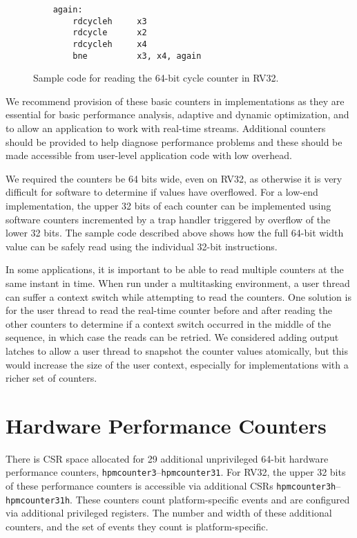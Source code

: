 \begin{figure}[h!]
\begin{center}
\begin{verbatim}
    again:
        rdcycleh     x3
        rdcycle      x2
        rdcycleh     x4
        bne          x3, x4, again
\end{verbatim}
\end{center}
\caption{Sample code for reading the 64-bit cycle counter in RV32.}
\label{rdcycle}
\end{figure}

\begin{commentary}
We recommend provision of these basic counters in implementations
as they are essential for basic performance analysis, adaptive and
dynamic optimization, and to allow an application to work with
real-time streams.  Additional counters should be provided to help
diagnose performance problems and these should be made accessible from
user-level application code with low overhead.

We required the counters be 64 bits wide, even on RV32, as otherwise
it is very difficult for software to determine if values have
overflowed.  For a low-end implementation, the upper 32 bits of each
counter can be implemented using software counters incremented by a
trap handler triggered by overflow of the lower 32 bits.  The sample
code described above shows how the full 64-bit width value can be
safely read using the individual 32-bit instructions.

In some applications, it is important to be able to read multiple
counters at the same instant in time.  When run under a multitasking
environment, a user thread can suffer a context switch while
attempting to read the counters.  One solution is for the user thread
to read the real-time counter before and after reading the other
counters to determine if a context switch occurred in the middle of the
sequence, in which case the reads can be retried.  We considered
adding output latches to allow a user thread to snapshot the counter
values atomically, but this would increase the size of the user
context, especially for implementations with a richer set of counters.
\end{commentary}

\section{Hardware Performance Counters}

There is CSR space allocated for 29 additional unprivileged 64-bit
hardware performance counters, {\tt hpmcounter3}--{\tt hpmcounter31}.
For RV32, the upper 32 bits of these performance counters is
accessible via additional CSRs {\tt hpmcounter3h}--{\tt
  hpmcounter31h}.  These counters count platform-specific events and
are configured via additional privileged registers.  The number and
width of these additional counters, and the set of events they count
is platform-specific.

